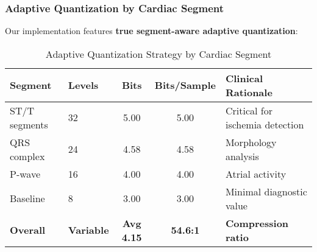 \documentclass[11pt]{article}
\begin{document}
\subsubsection{Adaptive Quantization by Cardiac Segment}

Our implementation features \textbf{true segment-aware adaptive quantization}:

\begin{table}[h]
\centering
\caption{Adaptive Quantization Strategy by Cardiac Segment}
\begin{tabular}{@{}llccl@{}}
\toprule
\textbf{Segment} & \textbf{Levels} & \textbf{Bits} & \textbf{Bits/Sample} & \textbf{Clinical Rationale} \\
\midrule
ST/T segments & 32 & 5.00 & 5.00 & Critical for ischemia detection \\
QRS complex & 24 & 4.58 & 4.58 & Morphology analysis \\
P-wave & 16 & 4.00 & 4.00 & Atrial activity \\
Baseline & 8 & 3.00 & 3.00 & Minimal diagnostic value \\
\midrule
\textbf{Overall} & \textbf{Variable} & \textbf{Avg 4.15} & \textbf{54.6:1} & \textbf{Compression ratio} \\
\bottomrule
\end{tabular}
\label{tab:adaptive_quant}
\end{table}
\end{document}
